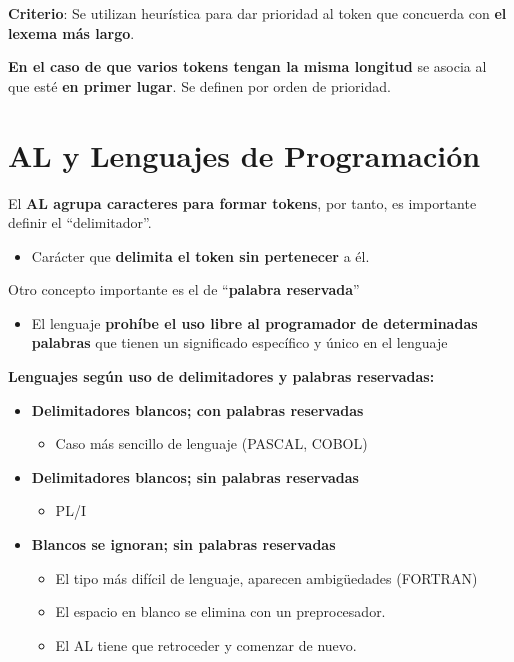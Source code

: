 \documentclass[12pt, twoside, openright]{report} %
\begin{document}
\textbf{Criterio}: Se utilizan heurística para dar prioridad al token
que concuerda con \textbf{el lexema más largo}.

\textbf{En el caso de que varios tokens tengan la misma longitud} se asocia al que
esté \textbf{en primer lugar}. Se definen por orden de prioridad.

\section{AL y Lenguajes de Programación}

El \textbf{AL agrupa caracteres para formar tokens}, por tanto, es
importante definir el ``delimitador''.

\begin{itemize}
	\item Carácter que \textbf{delimita el token sin pertenecer} a él.
\end{itemize}

Otro concepto importante es el de ``\textbf{palabra reservada}''

\begin{itemize}
	\item El lenguaje \textbf{prohíbe el uso libre al programador de
		      determinadas palabras} que tienen un significado específico y único en
	      el lenguaje
\end{itemize}

\textbf{Lenguajes según uso de delimitadores y palabras reservadas:}

\begin{itemize}
	\item \textbf{Delimitadores blancos; con palabras reservadas}

	      \begin{itemize}
		      \item Caso más sencillo de lenguaje (PASCAL, COBOL)
	      \end{itemize}
	\item \textbf{Delimitadores blancos; sin palabras reservadas}

	      \begin{itemize}
		      \item PL/I
	      \end{itemize}
	\item \textbf{Blancos se ignoran; sin palabras reservadas}

	      \begin{itemize}
		      \item El tipo más difícil de lenguaje, aparecen ambigüedades (FORTRAN)
		      \item El espacio en blanco se elimina con un preprocesador.
		      \item El AL tiene que retroceder y comenzar de nuevo.
	      \end{itemize}
\end{itemize}
\end{document}
